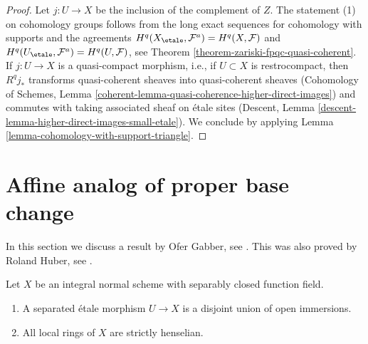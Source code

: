 \begin{proof}
Let $j : U \to X$ be the inclusion of the complement of $Z$.
The statement (1) on cohomology groups follows from the long
exact sequences for cohomology with supports and the agreements
$H^q(X_\etale, \mathcal{F}^a) = H^q(X, \mathcal{F})$ and
$H^q(U_\etale, \mathcal{F}^a) = H^q(U, \mathcal{F})$, see
Theorem \ref{theorem-zariski-fpqc-quasi-coherent}.
If $j : U \to X$ is a quasi-compact morphism, i.e., if $U \subset X$
is restrocompact, then $R^qj_*$ transforms quasi-coherent sheaves
into quasi-coherent sheaves
(Cohomology of Schemes, Lemma
\ref{coherent-lemma-quasi-coherence-higher-direct-images})
and commutes with taking associated
sheaf on \'etale sites
(Descent, Lemma \ref{descent-lemma-higher-direct-images-small-etale}).
We conclude by applying
Lemma \ref{lemma-cohomology-with-support-triangle}.
\end{proof}






\section{Affine analog of proper base change}
\label{section-gabber-affine-proper}

\noindent
In this section we discuss a result by Ofer Gabber, see
\cite{gabber-affine-proper}. This was also proved by Roland Huber, see
\cite{Huber-henselian}.

\begin{lemma}
\label{lemma-normal-scheme-with-alg-closed-function-field}
Let $X$ be an integral normal scheme with separably closed
function field.
\begin{enumerate}
\item A separated \'etale morphism $U \to X$ is a
disjoint union of open immersions.
\item All local rings of $X$ are strictly henselian.
\end{enumerate}
\end{lemma}

